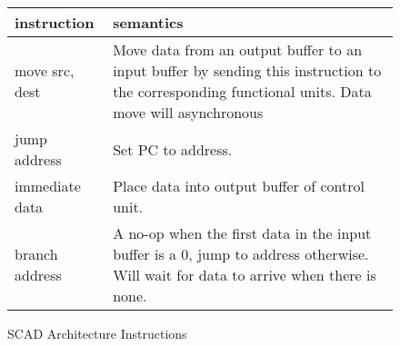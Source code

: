 		
		\begin{figure}[!ht]
			\begin{center}
				\begin{tabular}{| l | p{8cm} |}
					\hline
					\textbf{instruction} & \textbf{semantics} \\ \hline
					move src, dest & Move data from an output buffer to an input buffer by sending this instruction to the corresponding functional units. Data move will asynchronous \\ \hline
					jump address & Set PC to address. \\ \hline
					immediate data & Place data into output buffer of control unit. \\ \hline
					branch address & A no-op when the first data in the input buffer is a 0, jump to address otherwise. Will wait for data to arrive when there is none. \\ \hline
				\end{tabular}
				\label{fig:instruction_table}
				\caption{SCAD Architecture Instructions}
			\end{center}
		\end{figure}


